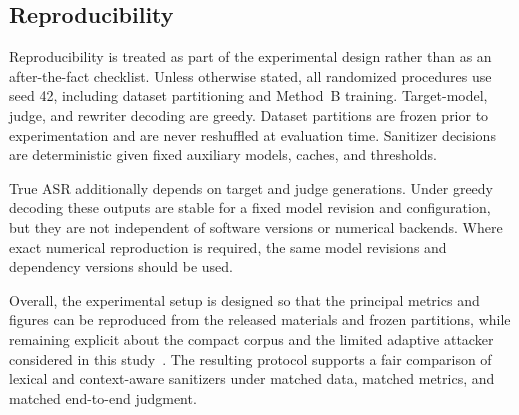 \subsection{Reproducibility}
\label{sec:repro-setup}

Reproducibility is treated as part of the experimental design rather than as an after-the-fact checklist.
Unless otherwise stated, all randomized procedures use seed 42, including dataset partitioning and Method~B training.
Target-model, judge, and rewriter decoding are greedy.
Dataset partitions are frozen prior to experimentation and are never reshuffled at evaluation time.
Sanitizer decisions are deterministic given fixed auxiliary models, caches, and thresholds.

True ASR additionally depends on target and judge generations.
Under greedy decoding these outputs are stable for a fixed model revision and configuration, but they are not independent of software versions or numerical backends.
Where exact numerical reproduction is required, the same model revisions and dependency versions should be used.

Overall, the experimental setup is designed so that the principal metrics and figures can be reproduced from the released materials and frozen partitions, while remaining explicit about the compact corpus and the limited adaptive attacker considered in this study~\cite{owasp_llm,zizzo2025adversarial}.
The resulting protocol supports a fair comparison of lexical and context-aware sanitizers under matched data, matched metrics, and matched end-to-end judgment.
